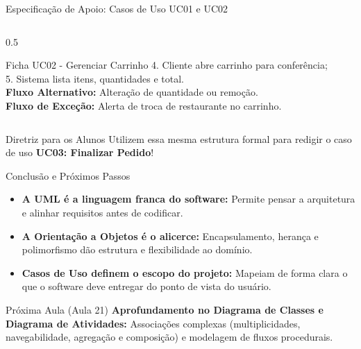 \documentclass[10pt]{beamer}
\begin{document}
\begin{frame}{Especificação de Apoio: Casos de Uso UC01 e UC02}
\begin{columns}
\begin{column}{0.5\textwidth}
\begin{block}{\scriptsize Ficha UC02 - Gerenciar Carrinho}
                4. Cliente abre carrinho para conferência; \\
                5. Sistema lista itens, quantidades e total. \\
                \textbf{Fluxo Alternativo:} Alteração de quantidade ou remoção. \\
                \textbf{Fluxo de Exceção:} Alerta de troca de restaurante no carrinho.
            \end{block}
        \end{column}
    \end{columns}
    \vspace{0.2cm}
    \begin{alertblock}{Diretriz para os Alunos}
        Utilizem essa mesma estrutura formal para redigir o caso de uso \textbf{UC03: Finalizar Pedido}!
    \end{alertblock}
\end{frame}

\begin{frame}{Conclusão e Próximos Passos}
    \begin{itemize}
        \item \textbf{A UML é a linguagem franca do software:} Permite pensar a arquitetura e alinhar requisitos antes de codificar.
        \item \textbf{A Orientação a Objetos é o alicerce:} Encapsulamento, herança e polimorfismo dão estrutura e flexibilidade ao domínio.
        \item \textbf{Casos de Uso definem o escopo do projeto:} Mapeiam de forma clara o que o software deve entregar do ponto de vista do usuário.
    \end{itemize}
    \vspace{0.3cm}
    \begin{exampleblock}{Próxima Aula (Aula 21)}
        \textbf{Aprofundamento no Diagrama de Classes e Diagrama de Atividades:}
        Associações complexas (multiplicidades, navegabilidade, agregação e composição) e modelagem de fluxos procedurais.
    \end{exampleblock}
\end{frame}
\end{document}
